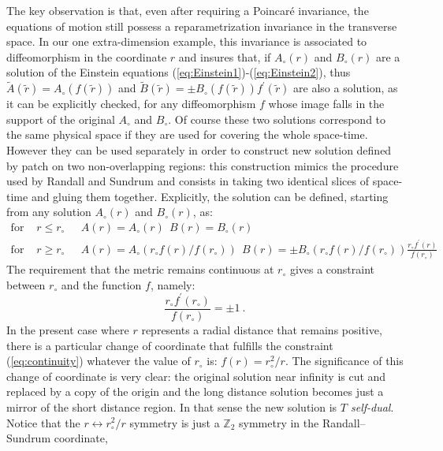 \documentclass[a4paper,12pt]{article}
\begin{document}
The key observation is that, even after requiring a Poincar\'e invariance,
the equations of motion still possess a reparametrization invariance in the
transverse space. In our one extra-dimension example, this invariance is associated
to diffeomorphism in the coordinate $r$ and insures that, if
$A_\circ (r)$ and $B_\circ (r)$ are a solution of the Einstein
equations (\ref{eq:Einstein1})-(\ref{eq:Einstein2}),
thus ${\tilde A} (\tilde r) = A_\circ (f(\tilde r))$
and ${\tilde B} (\tilde r) = \pm B_\circ (f(\tilde r)) f^\prime(\tilde r)$
are also a solution, as it can be explicitly checked, for any diffeomorphism
$f$ whose image falls in the support of the original $A_\circ$ and $B_\circ$.
Of course these two solutions correspond to the same physical space if they are used
for covering the whole space-time. However they can be used separately
in order to construct new solution defined by patch on two non-overlapping regions:
this construction mimics the procedure used by Randall and Sundrum and consists
in taking two identical slices of space-time and gluing them together.
Explicitly, the solution can be defined, starting from any
solution $A_\circ(r)$ and $B_\circ(r)$, as:
%
\begin{eqnarray}
	\label{eq:patch1}
\mbox{for } & r\leq r_\circ & \ \ \
A(r) = A_\circ (r) \ \
B(r) = B_\circ (r)
\\
	\label{eq:patch2}
\mbox{for } & r\geq r_\circ & \ \ \
A(r) = A_\circ (r_\circ f(r)/f(r_\circ)) \ \
B(r) = \pm B_\circ (r_\circ f(r)/f(r_\circ)) \frac{r_\circ f^\prime (r)}{f(r_\circ)}
\end{eqnarray}
%
The requirement  that the metric remains continuous at $r_\circ$ gives
a constraint between $r_\circ$ and the function $f$, namely:
%
\begin{equation}
	\label{eq:continuity}
 \frac{r_\circ f^\prime (r_\circ)}{f(r_\circ)} = \pm 1 \ .
\end{equation}
%
In the present case where $r$ represents a radial distance that remains
positive, there is a particular change of coordinate that fulfills the constraint
(\ref{eq:continuity}) whatever the value of $r_\circ$ is: $f(r) = r_\circ^2/r$.
The significance of this change of coordinate is very clear: the original solution
near infinity is cut and replaced by a copy of the origin and the long distance
solution becomes just a mirror of the short distance region. In that sense
the new solution is {\it $T$ self-dual}. Notice that
the $r \leftrightarrow r_\circ^2/r$ symmetry
is just a $\mathbb{Z}_2$ symmetry in the Randall--Sundrum coordinate,
\end{document}
